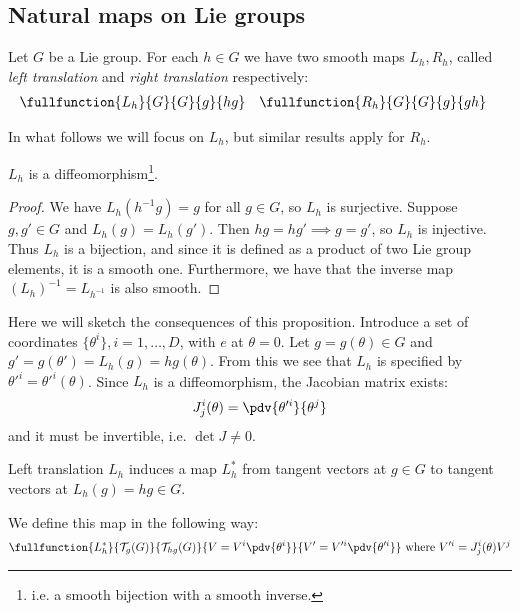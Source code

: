 \documentclass{jknotes}
\begin{document}
\subsection{Natural maps on Lie groups}
\begin{defn}
    Let \(G\) be a Lie group. For each \(h \in G\) we have two smooth maps \(L_h,R_h\), called \emph{left translation} and \emph{right translation} respectively:
    \begin{align}
        \fullfunction{L_h}{G}{G}{g}{hg}&
        &
        \fullfunction{R_h}{G}{G}{g}{gh}&
    \end{align}
\end{defn}
In what follows we will focus on \(L_h\), but similar results apply for \(R_h\).
\begin{lemma}
    \(L_h\) is a diffeomorphism\footnote{i.e. a smooth bijection with a smooth inverse.}.
\end{lemma}
\begin{proof}
    We have \(L_h(h^{-1}g)=g\) for all \(g \in G\), so \(L_h\) is surjective. Suppose \(g,g'\in G\) and \(L_h(g)=L_h(g')\). Then \(hg=hg'\implies g=g'\), so \(L_h\) is injective. Thus \(L_h\) is a bijection, and since it is defined as a product of two Lie group elements, it is a smooth one. Furthermore, we have that the inverse map \((L_h)^{-1}=L_{h^{-1}}\) is also smooth.
\end{proof}
Here we will sketch the consequences of this proposition. Introduce a set of coordinates \(\{\theta^i\}, i=1,\ldots,D\), with \(e\) at \(\theta=0\). Let \(g=g(\theta)\in G\) and \(g'=g(\theta')=L_h(g)=hg(\theta)\). From this we see that \(L_h\) is specified by \(\theta'^i=\theta'^i(\theta)\). Since \(L_h\) is a diffeomorphism, the Jacobian matrix exists:
\begin{equation}
    J_j^i(\theta) = \pdv{\theta'^i}{\theta^j}
\end{equation}
and it must be invertible, i.e. \(\det J\ne0\).

Left translation \(L_h\) induces a map \(L_h^*\) from tangent vectors at \(g\in G\) to tangent vectors at \(L_h(g) = hg \in G\).
\begin{figure}[H]
    \centering
\end{figure}
We define this map in the following way:
\begin{equation}
    \fullfunction{L_h^*}{\mathcal{T}_g(G)}{\mathcal{T}_{hg}(G)}{V=V^i\pdv{\theta^i}}{V'=V'^i\pdv{\theta'^i}}
    \text{ where }
    V'^i = J^i_j(\theta)V^j
\end{equation}
\end{document}
